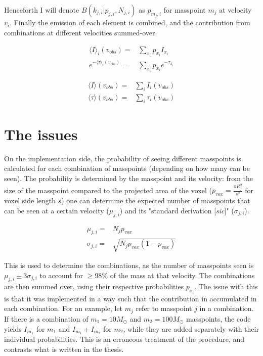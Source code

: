 \documentclass[onecolumn]{article}
\begin{document}
  Henceforth I will denote $B(k_{j,i}|p_{j,i}, N_{j,i})$ as $p_{m_j,i}$ for masspoint $m_j$ at velocity $v_i$. Finally the emission of each element is combined, and the contribution from combinations at different velocities summed-over.
  
  \begin{align*}
    \langle I \rangle_i(v_{obs}) =& \sum_{x_i} p_{x_i} I_{x_i} \\
    e^{-\langle \tau \rangle_i(v_{obs})} =& \sum_{x_i} p_{x_i} e^{-\tau_{x_i}}
  \end{align*}
  
  \begin{align*}
    \langle I \rangle(v_{obs}) =& \sum_{i} I_i(v_{obs}) \\
    \langle \tau \rangle(v_{obs}) =& \sum_{i} \tau_i(v_{obs})
  \end{align*}
  
  \section{The issues}
  On the implementation side, the probability of seeing different masspoints is calculated for each combination of masspoints (depending on how many can be seen). The probability is determined by the masspoint and its velocity: from the size of the masspoint compared to the projected area of the voxel ($p_{vox}=\frac{\pi R_j^2}{s^2}$ for voxel side length $s$) one can determine the expected number of masspoints that can be seen at a certain velocity ($\mu_{j,i}$) and its "standard derivation [\textit{sic}]" ($\sigma_{j,i}$).
  
  \begin{align*}
    \mu_{j,i} =& N_j p_{vox} \\
    \sigma_{j,i} =& \sqrt{N_j p_{vox} (1-p_{vox})}
  \end{align*}
  
  This is used to determine the combinations, as the number of masspoints seen is $\mu_{j,i} \pm 3\sigma_{j,i}$ to account for $\geq 98 \%$ of the mass at that velocity. The combinations are then summed over, using their respective probabilities $p_{x_i}$. The issue with this  is that it was implemented in a way such that the contribution in accumulated in each combination. For an example, let $m_j$ refer to masspoint $j$ in a combination. If there is a combination of $m_1 = 10 M_\odot$ and $m_2 = 100 M_\odot$ masspoints, the code yields $I_{m_1}$ for $m_1$ and $I_{m_1}+I_{m_2}$ for $m_2$, while they are added separately with their individual probabilities. This is an erroneous treatment of the procedure, and contrasts what is written in the thesis.
  
\end{document}
